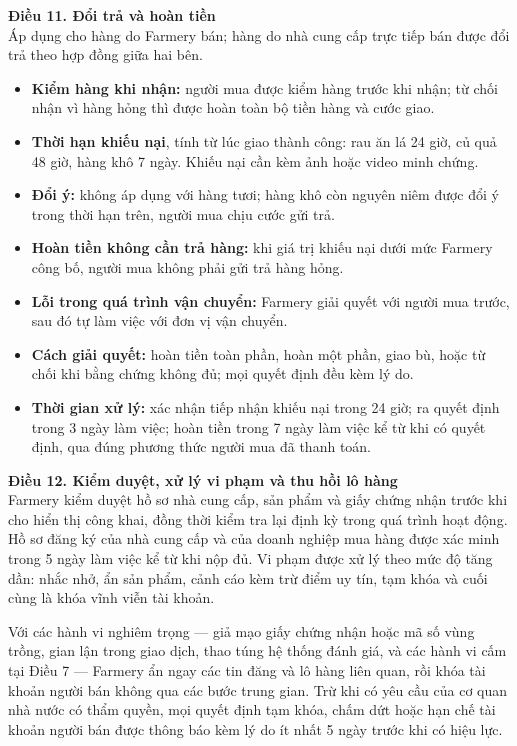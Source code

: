 \noindent\textbf{Điều 11. Đổi trả và hoàn tiền}\\
Áp dụng cho hàng do Farmery bán; hàng do nhà cung cấp trực tiếp bán được đổi
trả theo hợp đồng giữa hai bên.
\begin{itemize}
    \item \textbf{Kiểm hàng khi nhận:} người mua được kiểm hàng trước khi nhận;
    từ chối nhận vì hàng hỏng thì được hoàn toàn bộ tiền hàng và cước giao.
    \item \textbf{Thời hạn khiếu nại}, tính từ lúc giao thành công: rau ăn lá
    24 giờ, củ quả 48 giờ, hàng khô 7 ngày. Khiếu nại cần kèm ảnh hoặc video
    minh chứng.
    \item \textbf{Đổi ý:} không áp dụng với hàng tươi; hàng khô còn nguyên niêm
    được đổi ý trong thời hạn trên, người mua chịu cước gửi trả.
    \item \textbf{Hoàn tiền không cần trả hàng:} khi giá trị khiếu nại dưới
    mức Farmery công bố, người mua không phải gửi trả hàng hỏng.
    \item \textbf{Lỗi trong quá trình vận chuyển:} Farmery giải quyết với người
    mua trước, sau đó tự làm việc với đơn vị vận chuyển.
    \item \textbf{Cách giải quyết:} hoàn tiền toàn phần, hoàn một phần, giao bù,
    hoặc từ chối khi bằng chứng không đủ; mọi quyết định đều kèm lý do.
    \item \textbf{Thời gian xử lý:} xác nhận tiếp nhận khiếu nại trong 24 giờ;
    ra quyết định trong 3 ngày làm việc; hoàn tiền trong 7 ngày làm việc kể từ
    khi có quyết định, qua đúng phương thức người mua đã thanh toán.
\end{itemize}

\noindent\textbf{Điều 12. Kiểm duyệt, xử lý vi phạm và thu hồi lô hàng}\\
Farmery kiểm duyệt hồ sơ nhà cung cấp, sản phẩm và giấy chứng nhận trước khi
cho hiển thị công khai, đồng thời kiểm tra lại định kỳ trong quá trình hoạt
động. Hồ sơ đăng ký của nhà cung cấp và của doanh nghiệp mua hàng được xác
minh trong 5 ngày làm việc kể từ khi nộp đủ. Vi phạm được xử lý theo mức độ
tăng dần: nhắc nhở, ẩn sản phẩm, cảnh cáo kèm trừ điểm uy tín, tạm khóa và
cuối cùng là khóa vĩnh viễn tài khoản.

Với các hành vi nghiêm trọng --- giả mạo giấy chứng nhận hoặc mã số vùng
trồng, gian lận trong giao dịch, thao túng hệ thống đánh giá, và các hành vi
cấm tại Điều 7 --- Farmery ẩn ngay các tin đăng và lô hàng liên quan, rồi khóa
tài khoản người bán không qua các bước trung gian. Trừ khi có yêu cầu của cơ
quan nhà nước có thẩm quyền, mọi quyết định tạm khóa, chấm dứt hoặc hạn chế
tài khoản người bán được thông báo kèm lý do ít nhất 5 ngày trước khi có hiệu
lực.

